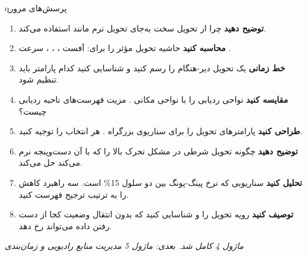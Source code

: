 
\begin{CNbox}[unbreakable]{q}{پرسش‌های مرور}

\begin{enumerate}
\def\labelenumi{\arabic{enumi}.}
\tightlist
\item
  \textbf{توضیح دهید} چرا  از تحویل سخت به‌جای تحویل نرم مانند  استفاده می‌کند.
\item
  \textbf{محاسبه کنید} حاشیه تحویل مؤثر را برای: آفست ، ، ، سرعت .
\item
  \textbf{خط زمانی} یک تحویل دیر-هنگام را رسم کنید و شناسایی کنید کدام پارامتر باید تنظیم شود.
\item
  \textbf{مقایسه کنید} نواحی ردیابی  را با نواحی مکانی . مزیت فهرست‌های ناحیه ردیابی چیست؟
\item
  \textbf{طراحی کنید} پارامترهای تحویل را برای سناریوی بزرگراه . هر انتخاب را توجیه کنید.
\item
  \textbf{توضیح دهید} چگونه تحویل شرطی در  مشکل تحرک بالا را که  با آن دست‌وپنجه نرم می‌کند حل می‌کند.
\item
  \textbf{تحلیل کنید} سناریویی که نرخ پینگ-پونگ بین دو سلول 15\% است. سه راهبرد کاهش را به ترتیب ترجیح فهرست کنید.
\item
  \textbf{توصیف کنید} رویه تحویل  را و شناسایی کنید که بدون انتقال وضعیت  کجا از دست رفتن داده می‌تواند رخ دهد.
\end{enumerate}

\emph{ماژول 4 کامل شد. بعدی: ماژول 5  مدیریت منابع رادیویی و زمان‌بندی}

\end{CNbox}
